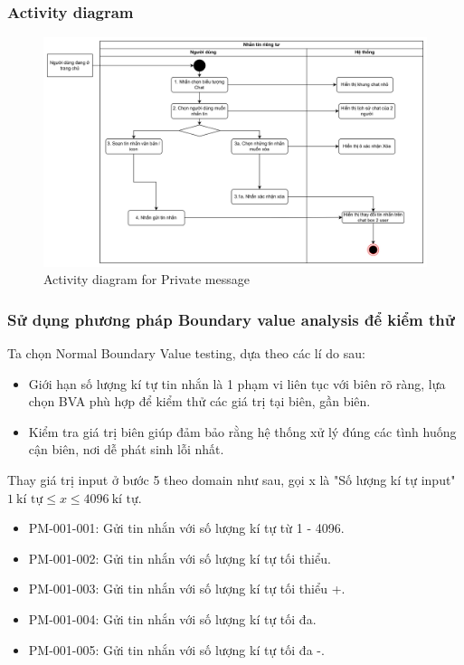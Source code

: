 \subsubsection{Activity diagram}
\begin{figure}[H]
    \centering
    \includegraphics[width=\textwidth]{image/private-message.png}
    \caption{Activity diagram for Private message}
    \label{fig:activity-diagram-private-message}
\end{figure}
\subsubsection{Sử dụng phương pháp Boundary value analysis để kiểm thử}
Ta chọn Normal Boundary Value testing, dựa theo các lí do sau:
\begin{itemize}
    \item Giới hạn số lượng kí tự tin nhắn là 1 phạm vi liên tục với biên rõ ràng, lựa chọn BVA phù hợp để kiểm thử các giá trị tại biên, gần biên.
    \item Kiểm tra giá trị biên giúp đảm bảo rằng hệ thống xử lý đúng các tình huống cận biên, nơi dễ phát sinh lỗi nhất.
\end{itemize}
Thay giá trị input ở bước 5 theo domain như sau, gọi x là "Số lượng kí tự input" \(1\ \text{kí tự} \leq x \leq 4096\ \text{kí tự}\).
\begin{itemize}
    \item PM-001-001: Gửi tin nhắn với số lượng kí tự từ 1 - 4096.
    \item PM-001-002: Gửi tin nhắn với số lượng kí tự tối thiểu.
    \item PM-001-003: Gửi tin nhắn với số lượng kí tự tối thiểu +.
    \item PM-001-004: Gửi tin nhắn với số lượng kí tự tối đa.
    \item PM-001-005: Gửi tin nhắn với số lượng kí tự tối đa -.
\end{itemize}

